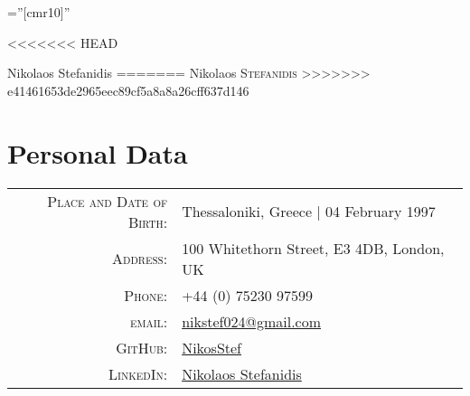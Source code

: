 \documentclass[a4paper,10pt]{article}
\begin{document}
\pagestyle{empty}

\font\fb=''[cmr10]''

\par{\centering
<<<<<<< HEAD
		{\Huge Nikolaos Stefanidis
=======
		{\Huge Nikolaos \textsc{Stefanidis}
>>>>>>> e41461653de2965eec89cf5a8a8a26cff637d146
	}\bigskip\par}

\section{Personal Data}

\begin{tabular}{rl}
    \textsc{Place and Date of Birth:} & Thessaloniki, Greece  | 04 February 1997 \\
    \textsc{Address:}   & 100 Whitethorn Street, E3 4DB, London, UK \\
    \textsc{Phone:}     & +44 (0) 75230 97599 \\
    \textsc{email:}     & \href{mailto:nikstef024@gmail.com}{nikstef024@gmail.com} \\
    \textsc{GitHub:}    & \href{https://github.com/NikosStef}{NikosStef} \\
    \textsc{LinkedIn:}  & \href{https://www.linkedin.com/in/nikolaos-stefanidis-b27aa711a/}{Nikolaos Stefanidis}
\end{tabular}

}
\end{document}
